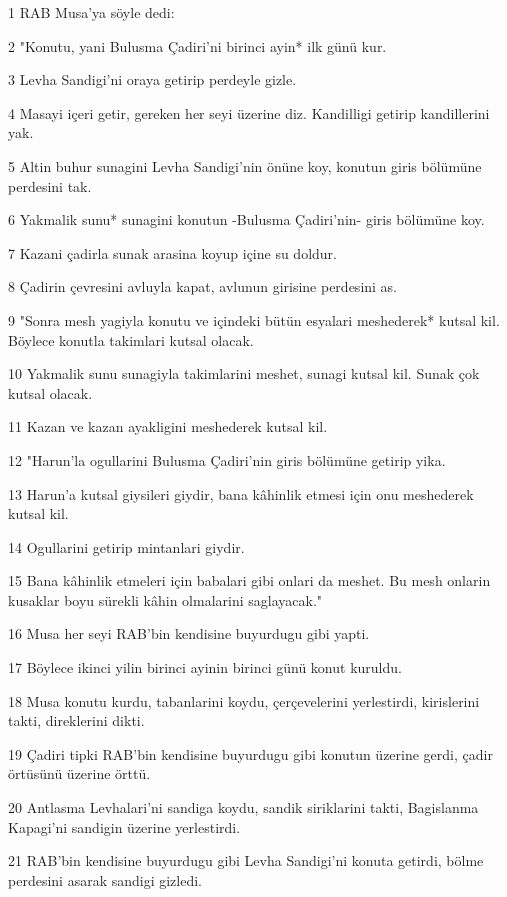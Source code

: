 \par 1 RAB Musa'ya söyle dedi:
\par 2 "Konutu, yani Bulusma Çadiri'ni birinci ayin* ilk günü kur.
\par 3 Levha Sandigi'ni oraya getirip perdeyle gizle.
\par 4 Masayi içeri getir, gereken her seyi üzerine diz. Kandilligi getirip kandillerini yak.
\par 5 Altin buhur sunagini Levha Sandigi'nin önüne koy, konutun giris bölümüne perdesini tak.
\par 6 Yakmalik sunu* sunagini konutun -Bulusma Çadiri'nin- giris bölümüne koy.
\par 7 Kazani çadirla sunak arasina koyup içine su doldur.
\par 8 Çadirin çevresini avluyla kapat, avlunun girisine perdesini as.
\par 9 "Sonra mesh yagiyla konutu ve içindeki bütün esyalari meshederek* kutsal kil. Böylece konutla takimlari kutsal olacak.
\par 10 Yakmalik sunu sunagiyla takimlarini meshet, sunagi kutsal kil. Sunak çok kutsal olacak.
\par 11 Kazan ve kazan ayakligini meshederek kutsal kil.
\par 12 "Harun'la ogullarini Bulusma Çadiri'nin giris bölümüne getirip yika.
\par 13 Harun'a kutsal giysileri giydir, bana kâhinlik etmesi için onu meshederek kutsal kil.
\par 14 Ogullarini getirip mintanlari giydir.
\par 15 Bana kâhinlik etmeleri için babalari gibi onlari da meshet. Bu mesh onlarin kusaklar boyu sürekli kâhin olmalarini saglayacak."
\par 16 Musa her seyi RAB'bin kendisine buyurdugu gibi yapti.
\par 17 Böylece ikinci yilin birinci ayinin birinci günü konut kuruldu.
\par 18 Musa konutu kurdu, tabanlarini koydu, çerçevelerini yerlestirdi, kirislerini takti, direklerini dikti.
\par 19 Çadiri tipki RAB'bin kendisine buyurdugu gibi konutun üzerine gerdi, çadir örtüsünü üzerine örttü.
\par 20 Antlasma Levhalari'ni sandiga koydu, sandik siriklarini takti, Bagislanma Kapagi'ni sandigin üzerine yerlestirdi.
\par 21 RAB'bin kendisine buyurdugu gibi Levha Sandigi'ni konuta getirdi, bölme perdesini asarak sandigi gizledi.
